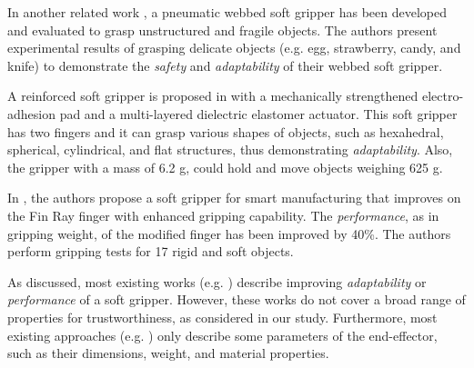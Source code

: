 \documentclass[lettersize,journal]{IEEEtran}
\begin{document}
In another related work \cite{Cai2021}, a pneumatic webbed soft gripper has been developed and evaluated to grasp unstructured and fragile objects. 
The authors present experimental results of grasping delicate objects (e.g. egg, strawberry, candy, and knife) to demonstrate the \emph{safety} and \emph{adaptability} of their webbed soft gripper. %

A reinforced soft gripper is proposed in \cite{Hwang2020} with a mechanically strengthened electro-adhesion pad and a multi-layered dielectric elastomer actuator. This soft gripper has two fingers and it can grasp various shapes of objects, such as hexahedral, spherical, cylindrical, and flat structures, thus demonstrating \emph{adaptability}. Also, the gripper with a mass of 6.2 g, could hold and move objects weighing 625 g. 

In \cite{Shin2021}, the authors propose a soft gripper for smart manufacturing that improves on the Fin Ray finger with enhanced gripping capability. The \emph{performance}, as in gripping weight, of the modified finger has been improved by 40\%. The authors perform gripping tests for 17 rigid and soft objects.

As discussed, most existing works (e.g. \cite{Cheng2021,Liu2021,Chen2018,Cai2021,Hwang2020,Shin2021}) describe improving \emph{adaptability} or \emph{performance} of a soft gripper. However, these works do not cover a broad range of properties for trustworthiness, as considered in our study. %
Furthermore, most existing approaches (e.g. \cite{Hong2022,Bhattacharya2019,Tadakuma2020,Loh2014,Nishikawa2019,Mohan2020}) only describe some parameters of the end-effector, such as their dimensions, weight, and material properties.%
\end{document}
